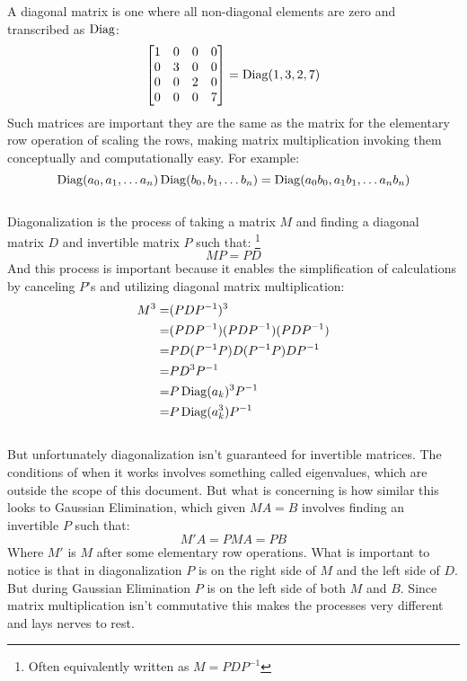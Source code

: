 A diagonal matrix is one where all non-diagonal elements are zero and transcribed as $\operatorname{Diag}$:
\[\begin{bmatrix}1&0&0&0\\0&3&0&0\\0&0&2&0\\0&0&0&7\end{bmatrix} = \operatorname{Diag}(1,3,2,7)\]
Such matrices are important they are the same as the matrix for the elementary row operation of scaling the rows,
making matrix multiplication invoking them conceptually and computationally easy.
For example:
\[\operatorname{Diag}(a_0,a_1,\dots a_n)\operatorname{Diag}(b_0,b_1,\dots b_n) = \operatorname{Diag}(a_0b_0,a_1b_1,\dots a_nb_n)\]
\\

Diagonalization is the process of taking a matrix $M$ and finding a diagonal matrix $D$ and invertible matrix $P$ such that:
\footnote{Often equivalently written as $M = PDP^{-1}$}
\[MP = PD\]
And this process is important because it enables the simplification of calculations by canceling $P$'s and utilizing diagonal matrix multiplication:
\begin{equation*}
\begin{aligned}
 M^3 =& (PDP^{-1})^3 \\
 =& (PDP^{-1})(PDP^{-1})(PDP^{-1}) \\
 =& PD(P^{-1} P)D(P^{-1} P)DP^{-1} \\
 =& PD^3P^{-1} \\
 =& P\operatorname{Diag}(a_k)^3P^{-1} \\
 =& P\operatorname{Diag}(a_k^3)P^{-1} \\
\end{aligned}
\end{equation*}
\\

But unfortunately diagonalization isn't guaranteed for invertible matrices.
The conditions of when it works involves something called eigenvalues,
which are outside the scope of this document.
But what is concerning is how similar this looks to Gaussian Elimination,
which given $MA =B$ involves finding an invertible $P$ such that:
\[M'A =PMA = PB\]
Where $M'$ is $M$ after some elementary row operations.
What is important to notice is that in diagonalization $P$ is on the right side of $M$ and the left side of $D$.
But during Gaussian Elimination $P$ is on the left side of both $M$ and $B$.
Since matrix multiplication isn't commutative this makes the processes very different and lays nerves to rest. 
\\

